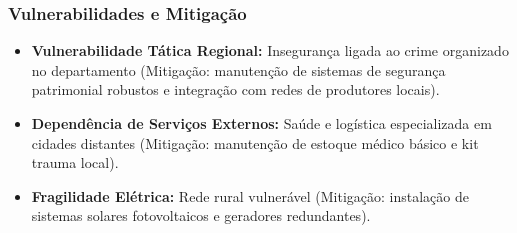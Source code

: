\subsubsection{Vulnerabilidades e
Mitigação}

\begin{itemize}
\tightlist
\item
  \textbf{Vulnerabilidade Tática Regional:} Insegurança ligada ao crime
  organizado no departamento (Mitigação: manutenção de sistemas de
  segurança patrimonial robustos e integração com redes de produtores
  locais).
\item
  \textbf{Dependência de Serviços Externos:} Saúde e logística
  especializada em cidades distantes (Mitigação: manutenção de estoque
  médico básico e kit trauma local).
\item
  \textbf{Fragilidade Elétrica:} Rede rural vulnerável (Mitigação:
  instalação de sistemas solares fotovoltaicos e geradores redundantes).
\end{itemize}

